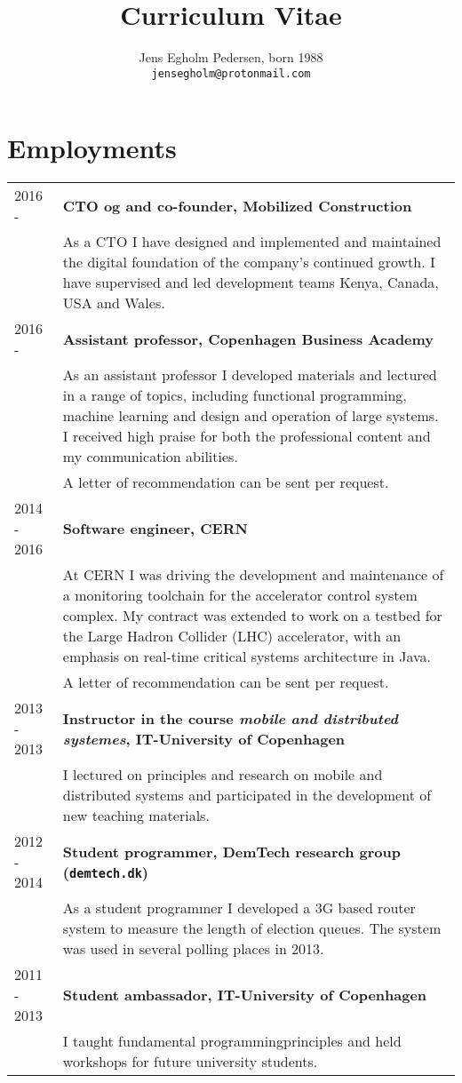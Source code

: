 \documentclass[12pt,a4paper,notitlepage]{article}
\author{Jens Egholm Pedersen, born 1988
\\ \texttt{jensegholm@protonmail.com}
}
\title{Curriculum Vitae}
\begin{document}
\maketitle

\section*{Employments}
\begin{tabularx}{\textwidth}{l X}
2016 -      & \textbf{CTO og and co-founder, Mobilized Construction} \\
            & As a CTO I have designed and implemented and maintained the
              digital foundation of the company's continued growth.
              I have supervised and led development teams Kenya, Canada, USA and Wales.\\
2016 -      & \textbf{Assistant professor, Copenhagen Business Academy} \\
            & As an assistant professor I developed materials and lectured in
              a range of topics, including functional programming,
              machine learning and design and operation of large systems.
              I received high praise for both the
              professional content and my communication abilities.\\
            & A letter of recommendation can be sent per request. \\
2014 - 2016 & \textbf{Software engineer, CERN} \\
            & At CERN I was driving the development and maintenance of
              a monitoring toolchain for the accelerator control system complex.
              My contract was extended to work on a testbed for the Large Hadron
              Collider (LHC) accelerator, with an emphasis on real-time critical
              systems architecture in Java. \\
            & A letter of recommendation can be sent per request. \\
2013 - 2013 & \textbf{Instructor in the course \textit{mobile and distributed systemes}, IT-University of Copenhagen} \\
            & I lectured on principles and research on mobile and distributed
              systems and participated in the development of new teaching
              materials. \\
2012 - 2014 & \textbf{Student programmer, DemTech research group (\texttt{demtech.dk})} \\
            & As a student programmer I developed a 3G based router system to
              measure the length of election queues. The system was used
              in several polling places in 2013.\\
2011 - 2013 & \textbf{Student ambassador, IT-University of Copenhagen} \\
            & I taught fundamental programmingprinciples and held workshops for
              future university students.
\end{tabularx}
\end{document}
